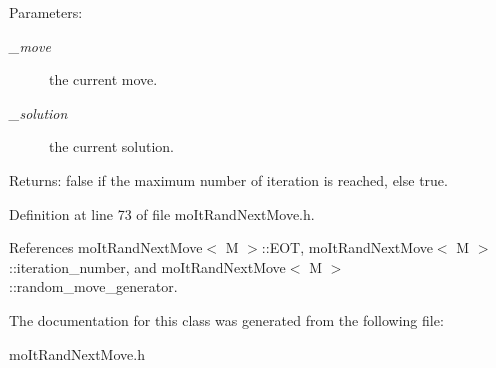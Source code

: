 \begin{Desc}
\item[Parameters:]
\begin{description}
\item[{\em \_\-move}]the current move. \item[{\em \_\-solution}]the current solution. \end{description}
\end{Desc}
\begin{Desc}
\item[Returns:]false if the maximum number of iteration is reached, else true. \end{Desc}


Definition at line 73 of file mo\-It\-Rand\-Next\-Move.h.

References mo\-It\-Rand\-Next\-Move$<$ M $>$::EOT, mo\-It\-Rand\-Next\-Move$<$ M $>$::iteration\_\-number, and mo\-It\-Rand\-Next\-Move$<$ M $>$::random\_\-move\_\-generator.

The documentation for this class was generated from the following file:\begin{CompactItemize}
\item 
mo\-It\-Rand\-Next\-Move.h\end{CompactItemize}
